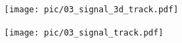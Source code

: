     \begin{figure}
        \centering
        \begin{subfigure}[t]{0.22\textwidth}
          \centering
          \texttt{[image: pic/03\_signal\_3d\_track.pdf]}
          \caption{}
        \end{subfigure}
        \begin{subfigure}[t]{0.44\textwidth}
          \centering
          \texttt{[image: pic/03\_signal\_track.pdf]}
          \caption{}
        \end{subfigure}
        \begin{subfigure}[t]{0.16\textwidth}
          \centering
          \setlength{\fboxsep}{0pt}
          \caption{}
        \end{subfigure}
        

\end{figure}
